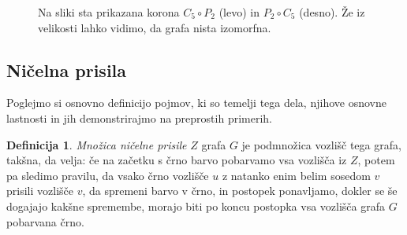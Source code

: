 \documentclass[12pt,a4paper,twoside]{article}
\theoremstyle{definition} %
\newtheorem{definicija}{Definicija}[section]
\theoremstyle{plain} %
\numberwithin{equation}{section}  %
\begin{document}
\begin{figure}[h]
\begin{subfigure}{0.66\textwidth}
    \end{subfigure}
    \caption{Na sliki sta prikazana korona $C_5 \circ P_2$ (levo) in $P_2 \circ C_5$ (desno). Že iz velikosti lahko vidimo, da grafa nista izomorfna.}
    \label{fig:korona-poti-cikla}
\end{figure}

\subsection{Ničelna prisila}

Poglejmo si osnovno definicijo pojmov, ki so temelji tega dela, njihove osnovne lastnosti in jih demonstrirajmo na preprostih primerih.

\begin{definicija}
    \emph{Množica ničelne prisile} $Z$ grafa $G$ je podmnožica vozlišč tega grafa, takšna, da velja: če na začetku s črno barvo pobarvamo vsa vozlišča iz $Z$, potem pa sledimo pravilu, da vsako črno vozlišče $u$ z natanko enim belim sosedom $v$ prisili vozlišče $v$, da spremeni barvo v črno, in postopek ponavljamo, dokler se še dogajajo kakšne spremembe, morajo biti po koncu postopka vsa vozlišča grafa $G$ pobarvana črno.
\end{definicija}
\end{document}
